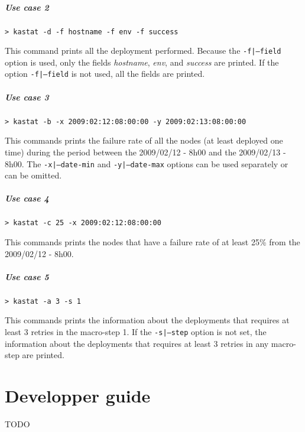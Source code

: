 \documentclass[a4wide,10pt,oneside]{book}
\begin{document}
\paragraph{Use case 2}
\begin{verbatim}
> kastat -d -f hostname -f env -f success
\end{verbatim}
This command prints all the deployment performed. Because the \texttt{-f|--field} option is used, only the fields \textit{hostname}, \textit{env}, and \textit{success} are printed. If the option \texttt{-f|--field} is not used, all the fields are printed.

\paragraph{Use case 3}
\begin{verbatim}
> kastat -b -x 2009:02:12:08:00:00 -y 2009:02:13:08:00:00
\end{verbatim}
This commands prints the failure rate of all the nodes (at least deployed one time) during the period between the 2009/02/12 - 8h00 and the 2009/02/13 - 8h00. The \texttt{-x|--date-min} and \texttt{-y|--date-max} options can be used separately or can be omitted.

\paragraph{Use case 4}
\begin{verbatim}
> kastat -c 25 -x 2009:02:12:08:00:00
\end{verbatim}
This commands prints the nodes that have a failure rate of at least 25\% from the 2009/02/12 - 8h00.

\paragraph{Use case 5}
\begin{verbatim}
> kastat -a 3 -s 1
\end{verbatim}
This commands prints the information about the deployments that requires at least 3 retries in the macro-step 1. If the \texttt{-s|--step} option is not set, the information about the deployments that requires at least 3 retries in any macro-step are printed.

\chapter{Developper guide}
TODO
\end{document}
